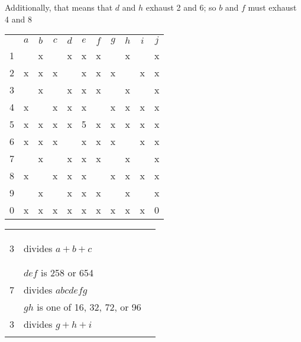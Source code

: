 Additionally, that means that $d$ and $h$ exhaust 2 and 6; so $b$ and $f$ must exhaust 4 and 8
\begin{center}
\begin{tabular}{ccccccccccc}
			&	$a$	&	$b$	&	$c$	&	$d$	&	$e$	&	$f$	&	$g$	&	$h$	&	$i$	&	$j$	\\
	1		&		&	x	&		&	x	&	x	&	x	&		&	x	&		&	x	\\
	2		&	x	&	x	&	x	&		&	x	&	x	&	x	&		&	x	&	x	\\
	3		&		&	x	&		&	x	&	x	&	x	&		&	x	&		&	x	\\
	4		&	x	&		&	x	&	x	&	x	&		&	x	&	x	&	x	&	x	\\
	5		&	x	&	x	&	x	&	x	&	5	&	x	&	x	&	x	&	x	&	x	\\
	6		&	x	&	x	&	x	&		&	x	&	x	&	x	&		&	x	&	x	\\
	7		&		&	x	&		&	x	&	x	&	x	&		&	x	&		&	x	\\
	8		&	x	&		&	x	&	x	&	x	&		&	x	&	x	&	x	&	x	\\
	9		&		&	x	&		&	x	&	x	&	x	&		&	x	&		&	x	\\
	0		&	x	&	x	&	x	&	x	&	x	&	x	&	x	&	x	&	x	&	0	\\
\end{tabular}
\hspace{1cm}\vline\hspace{1cm}
\begin{tabular}{rll}
	& 		\\
	& 		\\
	& 		\\
	3	&	divides $a+b+c$		\\
	& 		\\
	&		\\
	&	$def$ is 258 or 654		\\
	7	&	divides $abcdefg$	\\
		&	$gh$ is one of 16, 32, 72, or 96 \\
	3	&	divides $g+h+i$		\\
		&	
\end{tabular}
\end{center}


